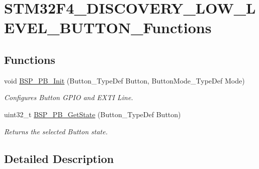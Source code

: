 \hypertarget{group__STM32F4__DISCOVERY__LOW__LEVEL__BUTTON__Functions}{\section{S\-T\-M32\-F4\-\_\-\-D\-I\-S\-C\-O\-V\-E\-R\-Y\-\_\-\-L\-O\-W\-\_\-\-L\-E\-V\-E\-L\-\_\-\-B\-U\-T\-T\-O\-N\-\_\-\-Functions}
\label{group__STM32F4__DISCOVERY__LOW__LEVEL__BUTTON__Functions}
}
\subsection*{Functions}
\begin{DoxyCompactItemize}
\item 
void \hyperlink{group__STM32F4__DISCOVERY__LOW__LEVEL__BUTTON__Functions_gaeece1cd3a2156a50bfa81638a27a1143}{B\-S\-P\-\_\-\-P\-B\-\_\-\-Init} (Button\-\_\-\-Type\-Def Button, Button\-Mode\-\_\-\-Type\-Def Mode)
\begin{DoxyCompactList}\small\item\em Configures Button G\-P\-I\-O and E\-X\-T\-I Line. \end{DoxyCompactList}\item 
uint32\-\_\-t \hyperlink{group__STM32F4__DISCOVERY__LOW__LEVEL__BUTTON__Functions_ga8f0978b6cffda9c67266ddfdb3a0abf7}{B\-S\-P\-\_\-\-P\-B\-\_\-\-Get\-State} (Button\-\_\-\-Type\-Def Button)
\begin{DoxyCompactList}\small\item\em Returns the selected Button state. \end{DoxyCompactList}\end{DoxyCompactItemize}


\subsection{Detailed Description}


